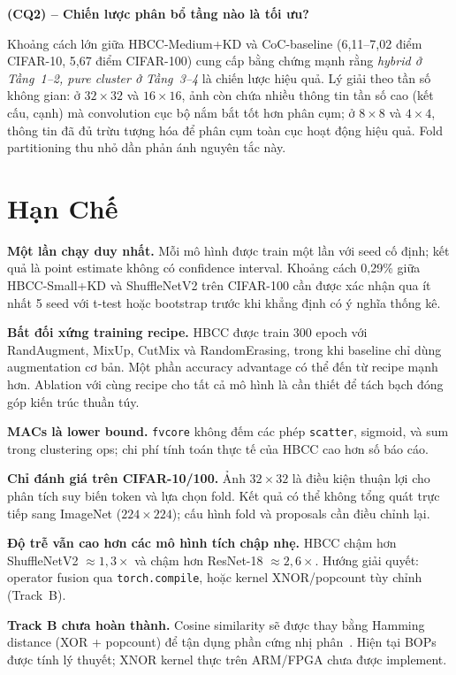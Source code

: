 \documentclass[journal]{IEEEtran}
\begin{document}
\noindent\textbf{(CQ2) -- Chiến lược phân bổ tầng nào là tối ưu?}

Khoảng cách lớn giữa HBCC-Medium+KD và CoC-baseline
(6,11--7,02 điểm CIFAR-10, 5,67 điểm CIFAR-100) cung cấp bằng chứng
mạnh rằng \emph{hybrid ở Tầng~1--2, pure cluster ở Tầng~3--4} là
chiến lược hiệu quả. Lý giải theo tần số không gian: ở
$32\!\times\!32$ và $16\!\times\!16$, ảnh còn chứa nhiều thông tin tần
số cao (kết cấu, cạnh) mà convolution cục bộ nắm bắt tốt hơn phân
cụm; ở $8\!\times\!8$ và $4\!\times\!4$, thông tin đã đủ trừu tượng
hóa để phân cụm toàn cục hoạt động hiệu quả. Fold partitioning thu
nhỏ dần phản ánh nguyên tắc này.

\section{Hạn Chế}
\label{sec:limitations}

\textbf{Một lần chạy duy nhất.} Mỗi mô hình được train một lần với
seed cố định; kết quả là point estimate không có confidence interval.
Khoảng cách 0,29\% giữa HBCC-Small+KD và ShuffleNetV2 trên CIFAR-100
cần được xác nhận qua ít nhất 5 seed với t-test hoặc bootstrap trước
khi khẳng định có ý nghĩa thống kê.

\textbf{Bất đối xứng training recipe.} HBCC được train 300 epoch với
RandAugment, MixUp, CutMix và RandomErasing, trong khi baseline chỉ
dùng augmentation cơ bản. Một phần accuracy advantage có thể đến từ
recipe mạnh hơn. Ablation với cùng recipe cho tất cả mô hình là cần
thiết để tách bạch đóng góp kiến trúc thuần túy.

\textbf{MACs là lower bound.} \texttt{fvcore} không đếm các phép
\texttt{scatter}, sigmoid, và sum trong clustering ops; chi phí tính
toán thực tế của HBCC cao hơn số báo cáo.

\textbf{Chỉ đánh giá trên CIFAR-10/100.} Ảnh $32\!\times\!32$ là
điều kiện thuận lợi cho phân tích suy biến token và lựa chọn fold.
Kết quả có thể không tổng quát trực tiếp sang ImageNet
($224\!\times\!224$); cấu hình fold và proposals cần điều chỉnh lại.

\textbf{Độ trễ vẫn cao hơn các mô hình tích chập nhẹ.} HBCC chậm
hơn ShuffleNetV2 $\approx\!1,3\!\times$ và chậm hơn ResNet-18
$\approx\!2,6\!\times$. Hướng giải quyết: operator fusion qua
\texttt{torch.compile}, hoặc kernel XNOR/popcount tùy chỉnh (Track~B).

\textbf{Track B chưa hoàn thành.} Cosine similarity sẽ được thay
bằng Hamming distance (XOR + popcount) để tận dụng phần cứng nhị
phân~\cite{Courbariaux2016BNN,Bengio2013STE}. Hiện tại BOPs được
tính lý thuyết; XNOR kernel thực trên ARM/FPGA chưa được implement.
\end{document}
